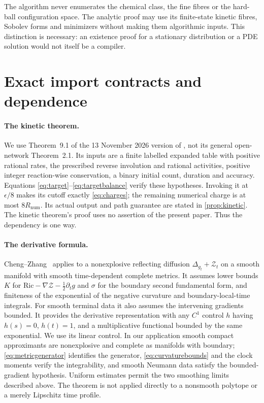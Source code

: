 \documentclass[11pt]{article}
\numberwithin{equation}{section}
\theoremstyle{definition}
\theoremstyle{remark}\newtheorem{remark}[theorem]{Remark}
\newcommand{\Rnum}{R_{\mathrm{num}}}
\begin{document}
The algorithm never enumerates the chemical class, the fine fibres or the
hard-ball configuration space. The analytic proof may use its finite-state
kinetic fibres, Sobolev forms and minimizers without making them algorithmic
inputs. This distinction is necessary: an existence proof for a stationary
distribution or a PDE solution would not itself be a compiler.



\section{Exact import contracts and dependence}
\label{app:imports}

\paragraph{The kinetic theorem.}
We use Theorem~9.1 of the 13 November 2026 version of
\cite{Sandhu2026}, not its general open-network Theorem~2.1.
Its inputs are a finite labelled expanded table with positive rational rates,
the prescribed reverse involution and rational activities, positive integer
reaction-wise conservation, a binary initial count, duration and accuracy.
Equations \eqref{eq:target}--\eqref{eq:targetbalance} verify these hypotheses.
Invoking it at $\epsilon/8$ makes its cutoff exactly \eqref{eq:charges};
the remaining numerical charge is at most $8\Rnum$. Its actual output
and path guarantee are stated in \cref{prop:kinetic}. The kinetic theorem's
proof uses no assertion of the present paper. Thus the dependency is one way.

\paragraph{The derivative formula.}
Cheng--Zhang~\cite[Theorem~2.5, equations (2.9)--(2.10)]{CZ2017} applies
to a nonexplosive reflecting diffusion $\Delta_{g_t}+\mathcal Z_t$ on a
smooth manifold with smooth time-dependent complete metrics. It assumes
lower bounds $K$ for
$\mathrm{Ric}-\nabla\mathcal Z-\tfrac12\partial_tg$ and $\sigma$ for
the boundary second fundamental form, and finiteness of the exponential
of the negative curvature and boundary-local-time integrals. For smooth
terminal data it also assumes the intervening gradients bounded. It
provides the derivative representation with any $C^1$ control $h$ having
$h(s)=0$, $h(t)=1$, and a multiplicative functional bounded by the same
exponential. We use its linear control. In our application smooth compact
approximants are nonexplosive and complete as manifolds with boundary;
\eqref{eq:metricgenerator} identifies the generator,
\eqref{eq:curvaturebounds} and the clock moments verify the integrability,
and smooth Neumann data satisfy the bounded-gradient hypothesis. Uniform
estimates permit the two smoothing limits described above. The theorem is
not applied directly to a nonsmooth polytope or a merely Lipschitz time
profile.
\end{document}
